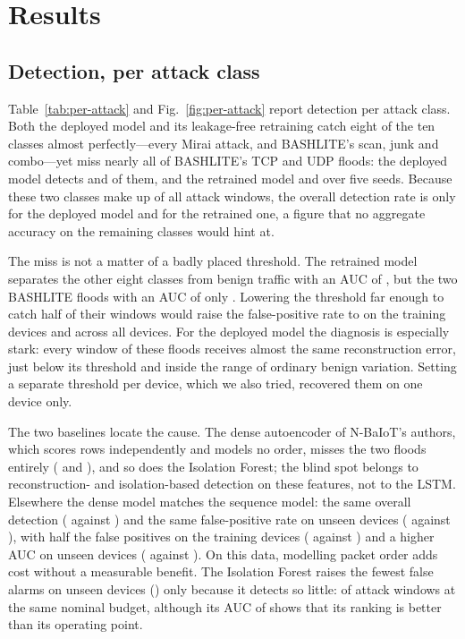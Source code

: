 \section{Results}
\label{sec:results}

\subsection{Detection, per attack class}
\label{sec:res-detect}

Table~\ref{tab:per-attack} and Fig.~\ref{fig:per-attack} report detection
per attack class. Both the deployed model and its leakage-free retraining catch
eight of the ten classes almost perfectly---every Mirai attack, and BASHLITE's
scan, junk and combo---yet miss nearly all of BASHLITE's TCP and UDP floods:
the deployed model detects \NdeplTcp{} and \NdeplUdp{} of them, and the
retrained model \NlstmTcp{} and \NlstmUdp{} over five seeds. Because these two
classes make up \NblindShare{} of all \NattackWindows{} attack windows, the
overall detection rate is only \NdeplTPR{} for the deployed model and
\NlstmTPR{} for the retrained one, a figure that no aggregate accuracy on the
remaining classes would hint at.

The miss is not a matter of a badly placed threshold. The retrained model
separates the other eight classes from benign traffic with an AUC of
\NotherAUC{}, but the two BASHLITE floods with an AUC of only \NblindAUC{}.
Lowering the threshold far enough to catch half of their windows would raise
the false-positive rate to \NblindCostFPRin{} on the training devices and
\NblindCostFPRall{} across all devices. For the deployed model the diagnosis
is especially stark: every window of these floods receives almost the same
reconstruction error, just below its threshold and inside the range of ordinary
benign variation. Setting a separate threshold per device, which we also tried,
recovered them on one device only.

The two baselines locate the cause. The dense autoencoder of N-BaIoT's
authors, which scores rows independently and models no order, misses the two
floods entirely (\NdenseTcp{} and \NdenseUdp{}), and so does the Isolation
Forest; the blind spot belongs to reconstruction- and isolation-based detection
on these features, not to the LSTM. Elsewhere the dense model matches the
sequence model: the same overall detection (\NdenseTPR{} against \NlstmTPR{})
and the same false-positive rate on unseen devices (\NdenseFPRout{} against
\NlstmFPRout{}), with half the false positives on the training devices
(\NdenseFPRin{} against \NlstmFPRin{}) and a higher AUC on unseen devices
(\NdenseAUCout{} against \NlstmAUCout{}). On this data, modelling packet order
adds cost without a measurable benefit. The Isolation Forest raises the fewest
false alarms on unseen devices (\NisoFPRout{}) only because it detects so
little: \NisoTPR{} of attack windows at the same nominal budget, although its
AUC of \NisoAUCout{} shows that its ranking is better than its operating point.

